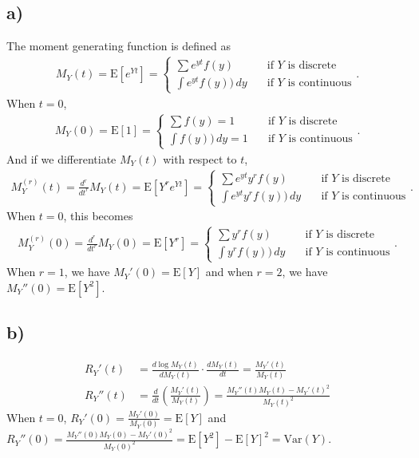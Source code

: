 \documentclass[a4paper]{article}
\newcommand{\E}{\mathrm{E}}
\newcommand{\Var}{\mathrm{Var}}
\begin{document}
\subsection{a)}
The moment generating function is defined as
\begin{align*}
M_{Y}(t) = \E\left[e^{Yt}\right] = 
\begin{cases}
\sum e^{yt} f(y) & \quad \mbox{if $Y$ is discrete}\\
\int e^{yt} f(y) )\,dy & \quad \mbox{if $Y$ is continuous}
\end{cases}.
\end{align*}
When $t = 0$,
\begin{align*}
M_{Y}(0) = \E\left[1\right] = 
\begin{cases}
\sum f(y) = 1 & \quad \mbox{if $Y$ is discrete}\\
\int f(y) )\, dy =1 & \quad \mbox{if $Y$ is continuous}
\end{cases}.
\end{align*}
And if we differentiate $M_{Y}(t)$ with respect to $t$,
\begin{align*}
M_{Y}^{(r)}(t) = \frac{d^{r}}{d t^{r}}M_{Y}(t) = \E\left[Y^{r}e^{Yt}\right] = 
\begin{cases}
\sum e^{yt} y^{r} f(y) & \quad \mbox{if $Y$ is discrete}\\
\int e^{yt} y^{r} f(y) )\,dy & \quad \mbox{if $Y$ is continuous}
\end{cases}.
\end{align*}
When $t = 0$, this becomes
\begin{align*}
M_{Y}^{(r)}(0) = \frac{d^{r}}{d t^{r}}M_{Y}(0) = \E\left[Y^{r}\right] = 
\begin{cases}
\sum y^{r} f(y) & \quad \mbox{if $Y$ is discrete}\\
\int y^{r} f(y) )\,dy & \quad \mbox{if $Y$ is continuous}
\end{cases}.
\end{align*}
When $r = 1$, we have $M_{Y}'(0) = \E\left[Y\right]$ and when  $r = 2$, we have $M_{Y}''(0) = \E\left[Y^{2}\right]$.

\subsection{b)}
\begin{align*}
R_{Y}'(t) &= \frac{d \log M_{Y}(t)}{d M_{Y}(t)} \cdot \frac{d M_{Y}(t)}{d t} = \frac{M_{Y}'(t)}{M_{Y}(t)}\\
R_{Y}''(t) &= \frac{d}{d t} \left(\frac{M_{Y}'(t)}{M_{Y}(t)} \right) = \frac{M_{Y}''(t) M_{Y}(t) - M_{Y}'(t)^2}{M_{Y}(t)^2}
\end{align*}
When $t = 0$, $R_{Y}'(0) = \frac{M_{Y}'(0)}{M_{Y}(0)} = \E\left[Y\right]$ and $R_{Y}''(0) = \frac{M_{Y}''(0) M_{Y}(0) - M_{Y}'(0)^2}{M_{Y}(0)^2} = \E\left[Y^{2}\right] - \E\left[Y\right]^{2} = \Var(Y)$.
\end{document}
